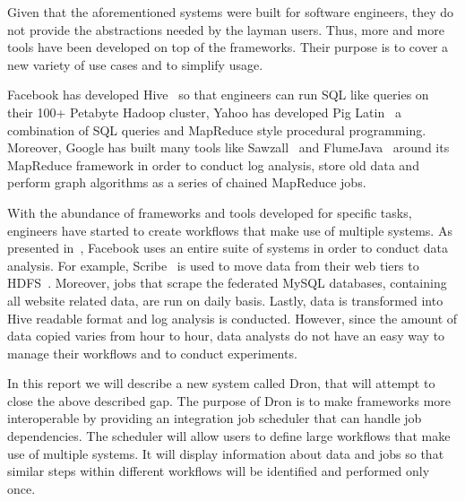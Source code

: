 \documentclass[11pt,a4paper,twoside]{report}
\begin{document}
Given that the aforementioned systems were built for software engineers, they do not provide the abstractions needed by the layman users. Thus, more and more tools have been developed on top of the frameworks. Their purpose is to cover a new variety of use cases and to simplify usage.


Facebook has developed Hive~\cite{Hive} so that engineers can run SQL like queries on their 100+ Petabyte Hadoop cluster, Yahoo has developed Pig Latin~\cite{Pig} a combination of SQL queries and MapReduce style procedural programming. Moreover, Google has built many tools like Sawzall~\cite{Sawzall} and FlumeJava~\cite{FlumeJava} around its MapReduce framework in order to conduct log analysis, store old data and perform graph algorithms as a series of chained MapReduce jobs.


With the abundance of frameworks and tools developed for specific tasks, engineers have started to create workflows that make use of multiple systems. As presented in~\cite{FacebookWarehouse}, Facebook uses an entire suite of systems in order to conduct data analysis. For example, Scribe~\cite{Scribe} is used to move data from their web tiers to HDFS~\cite{HDFS}. Moreover, jobs that scrape the federated MySQL databases, containing all website related data, are run on daily basis. Lastly, data is transformed into Hive readable format and log analysis is conducted. However, since the amount of data copied varies from hour to hour, data analysts do not have an easy way to manage their workflows and to conduct experiments.


In this report we will describe a new system called Dron, that will attempt to close the above described gap. The purpose of Dron is to make frameworks more interoperable by providing an integration job scheduler that can handle job dependencies. The scheduler will allow users to define large workflows that make use of multiple systems. It will display information about data and jobs so that similar steps within different workflows will be identified and performed only once.
\end{document}
